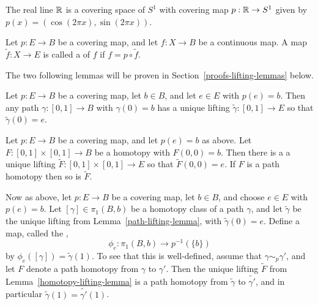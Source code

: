 \begin{example}
  \label{covering-of-circle}
  The real line $\mathbb{R}$ is a covering space of $S^1$ with covering map $p : \mathbb{R} \to S^1$ given by $p(x) = (\cos(2\pi x), \sin(2\pi x))$.
\end{example}

\begin{defn}
  Let $p : E \to B$ be a covering map, and let $f : X \to B$ be a continuous map. A map $\tilde{f} : X \to E$ is called a  of $f$ if $f = p \circ \tilde{f}$.
\end{defn}

The two following lemmas will be proven in Section~\ref{proofs-lifting-lemmas} below.
\begin{lem}
  \label{path-lifting-lemma}
  Let $p : E \to B$ be a covering map, let $b \in B$, and let $e \in E$ with $p(e) = b$. Then any path $\gamma : [0,1] \to B$ with $\gamma(0) = b$ has a unique lifting $\tilde{\gamma} : [0,1] \to E$ so that $\tilde{\gamma}(0) = e$.
\end{lem}

\begin{lem}
  \label{homotopy-lifting-lemma}
  Let $p : E \to B$ be a covering map, and let $p(e) = b$ as above. Let $F : [0,1] \times [0,1] \to B$ be a homotopy with $F(0,0) = b$. Then there is a a unique lifting $\tilde{F} : [0,1] \times [0,1] \to E$ so that $\tilde{F}(0,0) = e$. If $F$ is a path homotopy then so is $\tilde{F}$.
\end{lem}

Now as above, let $p : E \to B$ be a covering map, let $b \in B$, and choose $e \in E$ with $p(e) = b$. Let $[\gamma] \in \pi_1(B,b)$ be a homotopy class of a path $\gamma$, and let $\tilde{\gamma}$ be the unique lifting from Lemma~\ref{path-lifting-lemma}, with $\tilde{\gamma}(0) = e$. Define a map, called the ,
\[
  \phi_e : \pi_1(B,b) \to p^{-1}(\{b\})
\]
by $\phi_e([\gamma]) = \tilde{\gamma}(1)$. To see that this is well-defined, assume that $\gamma \sim_p \gamma'$, and let $F$ denote a path homotopy from $\gamma$ to $\gamma'$. Then the unique lifting $\tilde{F}$ from Lemma~\ref{homotopy-lifting-lemma} is a path homotopy from $\tilde{\gamma}$ to $\widetilde{\gamma'}$, and in particular $\tilde{\gamma}(1) = \widetilde{\gamma'}(1)$.


